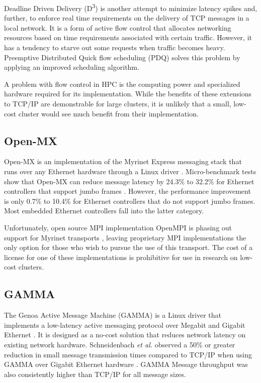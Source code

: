 \documentclass[11pt]{book}
\begin{document}
Deadline Driven Delivery (D\textsuperscript{3}) \cite{wilson-11} is another attempt to minimize
latency spikes and, further, to enforce real time requirements on the delivery of TCP
messages in a local network.  It is a form of active flow control that
allocates networking resources based on time requirements associated with certain traffic.
However, it has a tendency to starve out some requests when traffic becomes heavy.
Preemptive Distributed Quick flow scheduling (PDQ) \cite{hong-12} solves this problem by applying
an improved scheduling algorithm.

A problem with flow control in HPC is the computing power and specialized hardware
required for its implementation.  While the benefits of these extensions to TCP/IP are
demonstrable for large clusters, it is unlikely that a small, low-cost cluster would see
much benefit from their implementation.

\subsection{Open-MX}

Open-MX is an implementation of the Myrinet Express messaging stack that runs over any
Ethernet hardware through a Linux driver \cite{goglin-08}.  Micro-benchmark tests show
that Open-MX can reduce message latency by 24.3\% to 32.2\% for Ethernet controllers that
support jumbo frames \cite{goglin-11}.  However, the performance improvement is only 0.7\%
to 10.4\% for Ethernet controllers that do not support jumbo frames.  Most embedded
Ethernet controllers fall into the latter category.

Unfortunately, open source MPI implementation OpenMPI is phasing out support for Myrinet
transports \cite{openmpi-myrinet}, leaving proprietary MPI implementations the only option
for those who wish to pursue the use of this transport.  The cost of a license for one of
these implementations is prohibitive for use in research on low-cost clusters.

\subsection{GAMMA}

The Genoa Active Message Machine (GAMMA) is a Linux driver that implements a low-latency
active messaging protocol over Megabit and Gigabit Ethernet \cite{gamma}.  It is designed
as a no-cost solution that reduces network latency on existing network
hardware. Schneidenbach \emph{et al.} observed a 50\% or greater reduction in small message
transmission times compared to TCP/IP when using GAMMA over Gigabit Ethernet hardware
\cite{schneidenbach-03}.  GAMMA Message throughput was also consistently higher than
TCP/IP for all message sizes.
\end{document}
